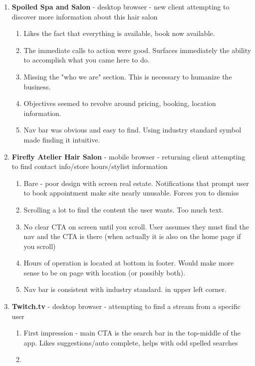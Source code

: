 \begin{enumerate}
\item
  \textbf{Spoiled Spa and Salon} - desktop browser - new client attempting to discover more information about this hair salon
  \begin{enumerate}
  \item
    Likes the fact that everything is available, book now available.
  \item
    The immediate calls to action were good. Surfaces immediately the ability to accomplish what you came here to do.
  \item
    Missing the "who we are" section. This is necessary to humanize the business.
  \item
    Objectives seemed to revolve around pricing, booking, location information.
  \item
    Nav bar was obvious and easy to find. Using industry standard symbol made finding it intuitive.
  \end{enumerate}
\item
  \textbf{Firefly Atelier Hair Salon} - mobile browser - returning client attempting to find contact info/store hours/stylist information
  \begin{enumerate}
  \item
    Bare - poor design with screen real estate. Notifications that prompt user to book appointment make site nearly unusable. Forces you to dismiss
  \item
    Scrolling a lot to find the content the user wants. Too much text.
  \item
    No clear CTA on screen until you scroll. User assumes they must find the nav and the CTA is there (when actually it is also on the home page if you scroll)
  \item
    Hours of operation is located at bottom in footer. Would make more sense to be on page with location (or possibly both).
  \item
    Nav bar is consistent with industry standard.  in upper left corner.
  \end{enumerate}
\item
  \textbf{Twitch.tv} - desktop browser - attempting to find a stream from a specific user
  \begin{enumerate}
  \item
    First impression - main CTA is the search bar in the top-middle of the app. Likes suggestions/auto complete, helps with odd spelled searches
  \item

\end{enumerate}
\end{enumerate}

